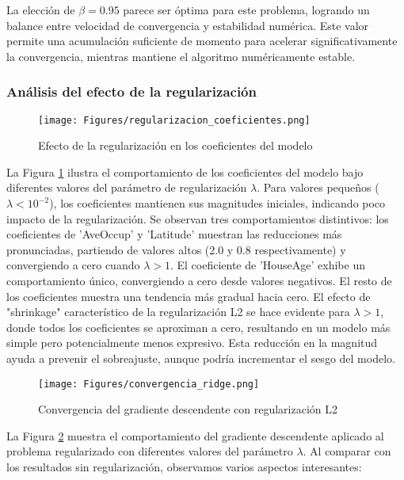 \documentclass{tp02}
\begin{document}
La elección de $\beta = 0.95$ parece ser óptima para este problema, 
logrando un balance entre velocidad de convergencia y estabilidad 
numérica. Este valor permite una acumulación suficiente de momento para 
acelerar significativamente la convergencia, mientras mantiene el 
algoritmo numéricamente estable.


\subsubsection{Análisis del efecto de la regularización}
\begin{figure}[H]
\centering
\texttt{[image: Figures/regularizacion\_coeficientes.png]}
\caption{Efecto de la regularización en los coeficientes del modelo}
\label{fig:reg_coef}
\end{figure}

La Figura \ref{fig:reg_coef} ilustra el comportamiento de los coeficientes
del modelo bajo diferentes valores del parámetro de regularización $\lambda$.
Para valores pequeños ($\lambda < 10^{-2}$), los coeficientes mantienen sus
magnitudes iniciales, indicando poco impacto de la regularización.
Se observan tres comportamientos distintivos: los coeficientes de 'AveOccup'
y 'Latitude' muestran las reducciones más pronunciadas, partiendo de valores
altos (2.0 y 0.8 respectivamente) y convergiendo a cero cuando $\lambda > 1$.
El coeficiente de 'HouseAge' exhibe un comportamiento único, convergiendo a
cero desde valores negativos. El resto de los coeficientes muestra una
tendencia más gradual hacia cero.
El efecto de "shrinkage" característico de la regularización L2 se hace
evidente para $\lambda > 1$, donde todos los coeficientes se aproximan a
cero, resultando en un modelo más simple pero potencialmente menos
expresivo. Esta reducción en la magnitud ayuda a prevenir el sobreajuste,
aunque podría incrementar el sesgo del modelo.

\begin{figure}[H]
\centering
\texttt{[image: Figures/convergencia\_ridge.png]}
\caption{Convergencia del gradiente descendente con regularización L2}
\label{fig:convergencia_ridge}
\end{figure}


La Figura \ref{fig:convergencia_ridge} muestra el comportamiento del 
gradiente descendente aplicado al problema regularizado con diferentes 
valores del parámetro $\lambda$. Al comparar con los resultados sin 
regularización, observamos varios aspectos interesantes:
\end{document}
